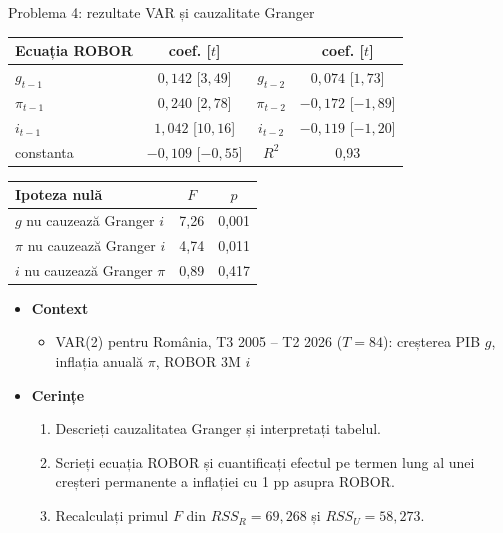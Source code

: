 \begin{frame}{Problema 4: rezultate VAR și cauzalitate Granger}
\itemsize{\footnotesize}
\begin{center}
\scriptsize
\begin{tabular}{lccc}
\toprule
\textbf{Ecuația ROBOR} & coef. [$t$] & & coef. [$t$] \\
\midrule
$g_{t-1}$ & $0{,}142$ [$3{,}49$] & $g_{t-2}$ & $0{,}074$ [$1{,}73$] \\
$\pi_{t-1}$ & $0{,}240$ [$2{,}78$] & $\pi_{t-2}$ & $\ensuremath{-}0{,}172$ [$\ensuremath{-}1{,}89$] \\
$i_{t-1}$ & $1{,}042$ [$10{,}16$] & $i_{t-2}$ & $\ensuremath{-}0{,}119$ [$\ensuremath{-}1{,}20$] \\
constanta & $\ensuremath{-}0{,}109$ [$\ensuremath{-}0{,}55$] & $R^2$ & 0{,}93 \\
\bottomrule
\end{tabular}
\end{center}
\begin{center}
\scriptsize
\begin{tabular}{lcc}
\toprule
\textbf{Ipoteza nulă} & $F$ & $p$ \\
\midrule
$g$ nu cauzează Granger $i$ & 7{,}26 & 0{,}001 \\
$\pi$ nu cauzează Granger $i$ & 4{,}74 & 0{,}011 \\
$i$ nu cauzează Granger $\pi$ & 0{,}89 & 0{,}417 \\
\bottomrule
\end{tabular}
\end{center}
\begin{itemize}
    \item \textbf{Context}
    \begin{itemize}
        \item VAR(2) pentru România, T3 2005 -- T2 2026 ($T = 84$): creșterea PIB $g$, inflația anuală $\pi$, ROBOR 3M $i$
    \end{itemize}
    \item \textbf{Cerințe}
\begin{enumerate}
    \item Descrieți cauzalitatea Granger și interpretați tabelul.
    \item Scrieți ecuația ROBOR și cuantificați efectul pe termen lung al unei creșteri permanente a inflației cu 1 pp asupra ROBOR.
    \item Recalculați primul $F$ din $RSS_R = 69{,}268$ și $RSS_U = 58{,}273$.
\end{enumerate}
\end{itemize}
\end{frame}

